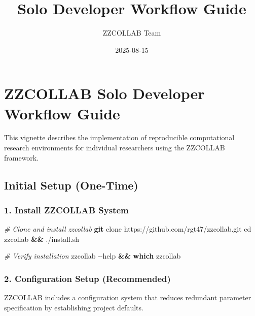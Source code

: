 \documentclass[
]{article}
\title{Solo Developer Workflow Guide}
\author{ZZCOLLAB Team}
\date{2025-08-15}
\newenvironment{Shaded}{\begin{snugshade}}{\end{snugshade}}
\newcommand{\AttributeTok}[1]{\textcolor[rgb]{0.13,0.29,0.53}{#1}}
\newcommand{\BuiltInTok}[1]{#1}
\newcommand{\CommentTok}[1]{\textcolor[rgb]{0.56,0.35,0.01}{\textit{#1}}}
\newcommand{\ExtensionTok}[1]{#1}
\newcommand{\FunctionTok}[1]{\textcolor[rgb]{0.13,0.29,0.53}{\textbf{#1}}}
\newcommand{\KeywordTok}[1]{\textcolor[rgb]{0.13,0.29,0.53}{\textbf{#1}}}
\newcommand{\NormalTok}[1]{#1}
\begin{document}
\maketitle

\section{ZZCOLLAB Solo Developer Workflow
Guide}\label{zzcollab-solo-developer-workflow-guide}

This vignette describes the implementation of reproducible computational
research environments for individual researchers using the ZZCOLLAB
framework.

\subsection{Initial Setup (One-Time)}\label{initial-setup-one-time}

\subsubsection{1. Install ZZCOLLAB
System}\label{install-zzcollab-system}

\begin{Shaded}
\begin{Highlighting}[]
\CommentTok{\# Clone and install zzcollab}
\FunctionTok{git}\NormalTok{ clone https://github.com/rgt47/zzcollab.git}
\BuiltInTok{cd}\NormalTok{ zzcollab }\KeywordTok{\&\&} \ExtensionTok{./install.sh}

\CommentTok{\# Verify installation  }
\ExtensionTok{zzcollab} \AttributeTok{{-}{-}help} \KeywordTok{\&\&} \FunctionTok{which}\NormalTok{ zzcollab}
\end{Highlighting}
\end{Shaded}

\subsubsection{2. Configuration Setup
(Recommended)}\label{configuration-setup-recommended}

ZZCOLLAB includes a configuration system that reduces redundant
parameter specification by establishing project defaults.
\end{document}
